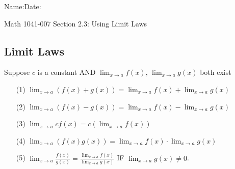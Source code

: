\documentclass[10pt]{book}
\theoremstyle{definition}
\begin{document}
\begin{flushleft}
Name:\underline{\hspace{13cm}}Date:\underline{\hspace{2cm}}
\end{flushleft}
\begin{center}
{\Large Math 1041-007 \hspace{0.5cm} Section 2.3: Using Limit Laws}
\end{center}

\begin{tcolorbox}
\subsection*{Limit Laws}
Suppose $c$ is a constant AND $\displaystyle\lim_{x\rightarrow a}f(x)$, $\displaystyle\lim_{x\rightarrow a}g(x)$ both exist
\begin{enumerate}
    \item[(1)] $\displaystyle\lim_{x\rightarrow a}\left(f(x)+g(x)\right)=\lim_{x\rightarrow a}f(x)+\lim_{x\rightarrow a}g(x)$
    \item[(2)]$\displaystyle\lim_{x\rightarrow a}\left(f(x)-g(x)\right)=\lim_{x\rightarrow a}f(x)-\lim_{x\rightarrow a}g(x)$
    \item[(3)] $\displaystyle\lim_{x\rightarrow a}cf(x)=c\left(\lim_{x\rightarrow a}f(x)\right)$
    \item[(4)]$\displaystyle\lim_{x\rightarrow a}\left(f(x)g(x)\right)=\lim_{x\rightarrow a}f(x)\cdot\lim_{x\rightarrow a}g(x)$
    \item[(5)]$\displaystyle \lim_{x\rightarrow a}\frac{f(x)}{g(x)}=\frac{\displaystyle\lim_{x\rightarrow a} f(x)}{\displaystyle\lim_{x\rightarrow a}g(x)}$ IF $\displaystyle\lim_{x\rightarrow a}g(x)\neq 0$.
\end{enumerate}
\end{tcolorbox}
\end{document}
